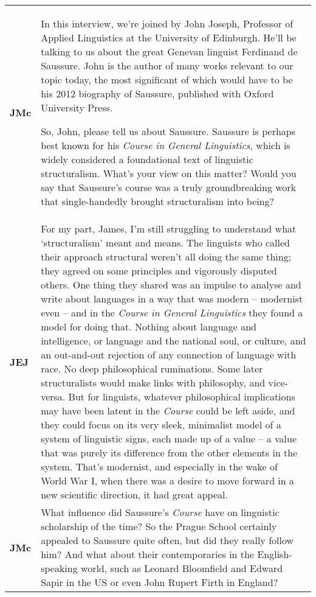 \documentclass[12pt]{article}
\begin{document}
\begin{flushleft}
\tablefirsthead{}
\tablehead{}
\tabletail{}
\tablelasttail{}
\begin{supertabular}{m{0.24415985in}m{5.89766in}}
\textbf{JMc}\newline
 &
In this interview, we’re joined by John Joseph, Professor of Applied Linguistics at the University of Edinburgh. He’ll be talking to us about the great Genevan linguist Ferdinand de Saussure. John is the author of many works relevant to our topic today, the most significant of which would have to be his 2012 biography of Saussure, published with Oxford University Press.

So, John, please tell us about Saussure. Saussure is perhaps best known for his \textit{Course in General Linguistics}, which is widely considered a foundational text of linguistic structuralism. What’s your view on this matter? Would you say that Saussure’s course was a truly groundbreaking work that single-handedly brought structuralism into being?\\
\textbf{JEJ}\newline
 &
For my part, James, I’m still struggling to understand what ‘structuralism’ meant and means. The linguists who called their approach structural weren’t all doing the same thing; they agreed on some principles and vigorously disputed others. One thing they shared was an impulse to analyse and write about languages in a way that was modern – modernist even – and in the \textit{Course in General Linguistics} they found a model for doing that. Nothing about language and intelligence, or language and the national soul, or culture, and an out-and-out rejection of any connection of language with race. No deep philosophical ruminations. Some later structuralists would make links with philosophy, and vice-versa. But for linguists, whatever philosophical implications may have been latent in the \textit{Course} could be left aside, and they could focus on its very sleek, minimalist model of a system of linguistic signs, each made up of a value – a value that was purely its difference from the other elements in the system. That’s modernist, and especially in the wake of World War I, when there was a desire to move forward in a new scientific direction, it had great appeal.\\
\textbf{JMc}\newline
 &
What influence did Saussure’s \textit{Course} have on linguistic scholarship of the time? So the Prague School certainly appealed to Saussure quite often, but did they really follow him? And what about their contemporaries in the English-speaking world, such as Leonard Bloomfield and Edward Sapir in the US or even John Rupert Firth in England?\\

\end{supertabular}
\end{flushleft}
\end{document}
